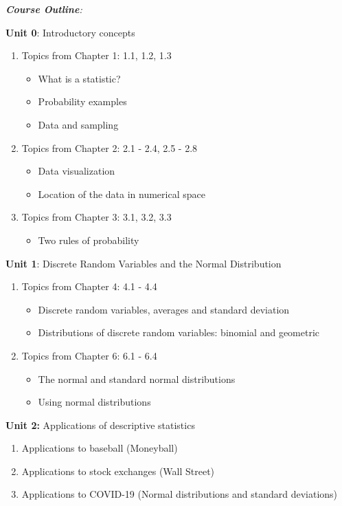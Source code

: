 \documentclass[10pt]{article}
\begin{document}
\textit{\textbf{Course Outline}:}
\begin{outline}[enumerate]
\1 \textbf{Unit 0}: Introductory concepts
\begin{enumerate}
\item Topics from Chapter 1: 1.1, 1.2, 1.3
\begin{itemize}
\item What is a statistic?
\item Probability examples
\item Data and sampling
\end{itemize}
\item Topics from Chapter 2: 2.1 - 2.4, 2.5 - 2.8
\begin{itemize}
\item Data visualization
\item Location of the data in numerical space
\end{itemize}
\item Topics from Chapter 3: 3.1, 3.2, 3.3
\begin{itemize}
\item Two rules of probability
\end{itemize}
\end{enumerate}
\1 \textbf{Unit 1}: Discrete Random Variables and the Normal Distribution
\begin{enumerate}
\item Topics from Chapter 4: 4.1 - 4.4
\begin{itemize}
\item Discrete random variables, averages and standard deviation
\item Distributions of discrete random variables: binomial and geometric
\end{itemize}
\item Topics from Chapter 6: 6.1 - 6.4
\begin{itemize}
\item The normal and standard normal distributions
\item Using normal distributions
\end{itemize}
\end{enumerate}
\1 \textbf{Unit 2:} Applications of descriptive statistics
\begin{enumerate}
\item Applications to baseball (Moneyball)
\item Applications to stock exchanges (Wall Street)
\item Applications to COVID-19 (Normal distributions and standard deviations)

\end{enumerate}
\end{outline}
\end{document}
